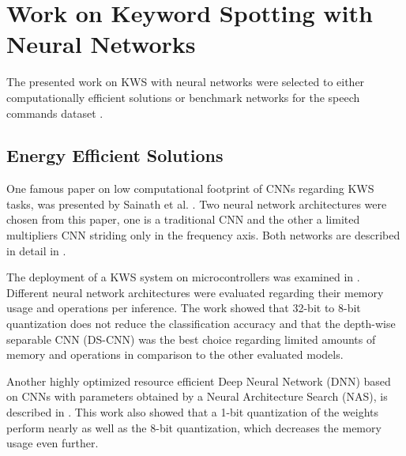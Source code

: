 
\section{Work on Keyword Spotting with Neural Networks}\label{sec:prev_kws}
The presented work on KWS with neural networks were selected to either computationally efficient solutions or benchmark networks for the speech commands dataset \cite{Warden2018}.



\subsection{Energy Efficient Solutions}
One famous paper on low computational footprint of CNNs regarding KWS tasks, was presented by Sainath et al. \cite{Sainath2015}.
Two neural network architectures were chosen from this paper, one is a traditional CNN and the other a limited multipliers CNN striding only in the frequency axis.
Both networks are described in detail in .

The deployment of a KWS system on microcontrollers was examined in \cite{Zhang2017}.
Different neural network architectures were evaluated regarding their memory usage and operations per inference.
The work showed that 32-bit to 8-bit quantization does not reduce the classification accuracy and that the depth-wise separable CNN (DS-CNN) was the best choice regarding limited amounts of memory and operations in comparison to the other evaluated models.

Another highly optimized resource efficient Deep Neural Network (DNN) based on CNNs with parameters obtained by a Neural Architecture Search (NAS), is described in \cite{Peter2020}.
This work also showed that a 1-bit quantization of the weights perform nearly as well as the 8-bit quantization, which decreases the memory usage even further.



